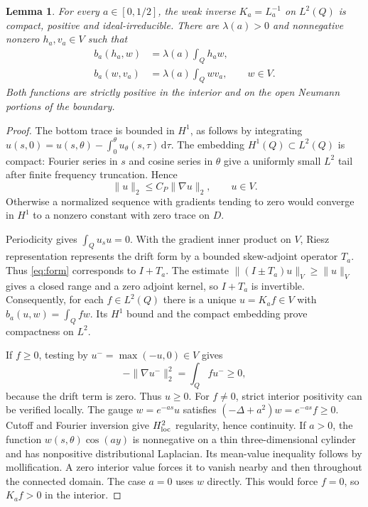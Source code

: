 \documentclass[11pt]{article}
\newtheorem{lemma}[theorem]{Lemma}
\newcommand{\dd}{\,\mathrm d}
\begin{document}
\begin{lemma}\label{lem:principal}
For every \(a\in[0,1/2]\), the weak inverse \(K_a=L_a^{-1}\) on \(L^2(Q)\)
is compact, positive and ideal-irreducible. There are
\(\lambda(a)>0\) and nonnegative nonzero \(h_a,v_a\in V\) such that
\begin{align}
 b_a(h_a,w)&=\lambda(a)\int_Qh_aw,\label{eq:eigen-direct}\\
 b_a(w,v_a)&=\lambda(a)\int_Qwv_a,\qquad w\in V.\label{eq:eigen-adjoint}
\end{align}
Both functions are strictly positive in the interior and on the open
Neumann portions of the boundary.
\end{lemma}
\begin{proof}
The bottom trace is bounded in \(H^1\), as follows by integrating
\(u(s,0)=u(s,\theta)-\int_0^\theta u_\theta(s,\tau)\dd\tau\).
The embedding \(H^1(Q)\subset L^2(Q)\) is compact: Fourier series in \(s\)
and cosine series in \(\theta\) give a uniformly small \(L^2\) tail after
finite frequency truncation. Hence
\[
 \|u\|_2\le C_P\|\nabla u\|_2,\qquad u\in V.
\]
Otherwise a normalized sequence with gradients tending to zero would
converge in \(H^1\) to a nonzero constant with zero trace on \(D\).

Periodicity gives \(\int_Q u_su=0\). With the gradient inner product on
\(V\), Riesz representation \cite[Theorems 180 and 184]{MIT} represents
the drift form by a bounded skew-adjoint operator \(T_a\).
Thus \eqref{eq:form} corresponds to \(I+T_a\). The estimate
\(\|(I\pm T_a)u\|_V\ge\|u\|_V\) gives a closed range and a zero adjoint
kernel, so \(I+T_a\) is invertible. Consequently, for each \(f\in L^2(Q)\)
there is a unique \(u=K_af\in V\) with
\(b_a(u,w)=\int_Qfw\). Its \(H^1\) bound and the compact embedding prove
compactness on \(L^2\).

If \(f\ge0\), testing by \(u^-=\max(-u,0)\in V\) gives
\[
 -\|\nabla u^-\|_2^2=\int_Q f u^-\ge0,
\]
because the drift term is zero. Thus \(u\ge0\).
For \(f\ne0\), strict interior positivity can be verified locally.
The gauge \(w=e^{-as}u\) satisfies
\((-\Delta+a^2)w=e^{-as}f\ge0\).
Cutoff and Fourier inversion give \(H^2_{\rm loc}\) regularity, hence
continuity. If \(a>0\), the function \(w(s,\theta)\cos(ay)\) is nonnegative
on a thin three-dimensional cylinder and has nonpositive distributional
Laplacian. Its mean-value inequality follows by mollification. A zero
interior value forces it to vanish nearby and then throughout the connected
domain. The case \(a=0\) uses \(w\) directly. This would force \(f=0\),
so \(K_af>0\) in the interior.


\end{proof}
\end{document}
